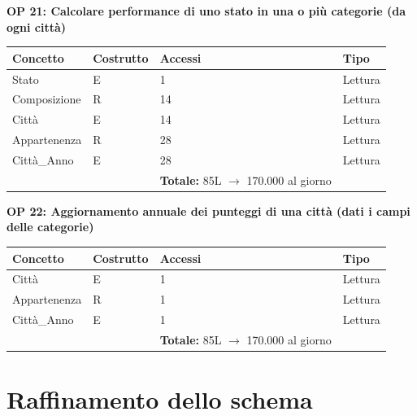 \documentclass[a4paper,12pt]{report}
\begin{document}
            \noindent
            \textbf{OP 21: Calcolare performance di uno stato in una o più categorie (da ogni città)}
        	\begin{table}[H]
            \centering
             \begin{tabular}{llll}
             \rowcolor{yellow!20} \textbf{Concetto} & \textbf{Costrutto} & \textbf{Accessi} & \textbf{Tipo}\\ [0.5ex] 
             \hline
             Stato & E & 1 & Lettura \\ 
             Composizione & R & 14 & Lettura \\ 
             Città & E & 14 & Lettura \\ 
             Appartenenza & R & 28 & Lettura \\ 
             Città\_Anno & E & 28 & Lettura \\ 
             \hline
                \rowcolor{yellow!20} &   & \textbf{Totale:} 85L $\rightarrow$ 170.000 al giorno &  \\ [1ex] 
             
             \end{tabular}
            \end{table}

            \noindent
            \textbf{OP 22: Aggiornamento annuale dei punteggi di una città (dati i campi delle categorie)}
        	\begin{table}[H]
            \centering
             \begin{tabular}{llll}
             \rowcolor{yellow!20} \textbf{Concetto} & \textbf{Costrutto} & \textbf{Accessi} & \textbf{Tipo}\\ [0.5ex] 
             \hline
             Città & E & 1 & Lettura \\ 
             Appartenenza & R & 1 & Lettura \\ 
             Città\_Anno & E & 1 & Lettura \\ 
             \hline
                \rowcolor{yellow!20} &   & \textbf{Totale:} 85L $\rightarrow$ 170.000 al giorno &  \\ [1ex] 
             
             \end{tabular}
            \end{table}
        
        \section{Raffinamento dello schema}
\end{document}
